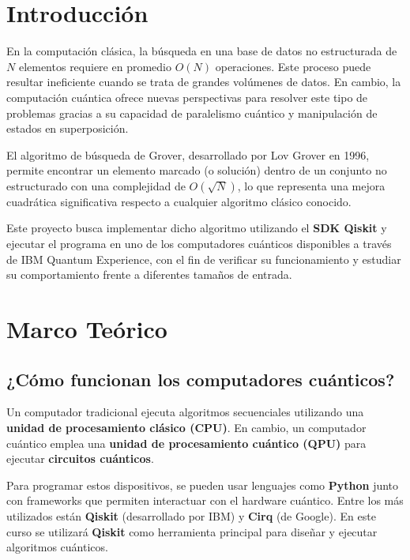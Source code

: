 \documentclass{article}
\begin{document}
\section{Introducción}\label{sec:intr}

En la computación clásica, la búsqueda en una base de datos no estructurada de $N$ elementos requiere en promedio $O(N)$ operaciones. Este proceso puede resultar ineficiente cuando se trata de grandes volúmenes de datos. En cambio, la computación cuántica ofrece nuevas perspectivas para resolver este tipo de problemas gracias a su capacidad de paralelismo cuántico y manipulación de estados en superposición.

El algoritmo de búsqueda de Grover, desarrollado por Lov Grover en 1996, permite encontrar un elemento marcado (o solución) dentro de un conjunto no estructurado con una complejidad de $O(\sqrt{N})$, lo que representa una mejora cuadrática significativa respecto a cualquier algoritmo clásico conocido.

Este proyecto busca implementar dicho algoritmo utilizando el \textbf{SDK Qiskit} y ejecutar el programa en uno de los computadores cuánticos disponibles a través de IBM Quantum Experience, con el fin de verificar su funcionamiento y estudiar su comportamiento frente a diferentes tamaños de entrada.


\section{Marco Teórico}\label{sec:marc}

\subsection*{¿Cómo funcionan los computadores cuánticos?}

Un computador tradicional ejecuta algoritmos secuenciales utilizando una \textbf{unidad de procesamiento clásico (CPU)}. En cambio, un computador cuántico emplea una \textbf{unidad de procesamiento cuántico (QPU)} para ejecutar \textbf{circuitos cuánticos}.

Para programar estos dispositivos, se pueden usar lenguajes como \textbf{Python} junto con frameworks que permiten interactuar con el hardware cuántico. Entre los más utilizados están \textbf{Qiskit} (desarrollado por IBM) y \textbf{Cirq} (de Google). En este curso se utilizará \textbf{Qiskit} como herramienta principal para diseñar y ejecutar algoritmos cuánticos.
\end{document}
